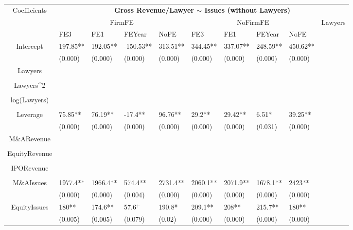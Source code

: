 \documentclass{article}
\begin{document}
\begin{table}[H]
\centering
\begin{tabular}{|clllllllll|}
\hline
\multirow{3}{*}{Coefficients} & \multicolumn{9}{c|}{\textbf{Gross Revenue/Lawyer $\sim$ Issues (without Lawyers)}} \\
\cline{2-10}
& \multicolumn{4}{c}{FirmFE} & \multicolumn{4}{c}{NoFirmFE} & \multirow{2}{*}{Lawyers} \\
\cline{2-9}
& FE3 & FE1 & FEYear & NoFE & FE3 & FE1 & FEYear & NoFE &  \\
\hline
 
Intercept & 197.85** & 192.05** & -150.53** & 313.51** & 344.45** & 337.07** & 248.59** & 450.62** & \\ 
   & (0.000) & (0.000) & (0.000) & (0.000) & (0.000) & (0.000) & (0.000) & (0.000) & \\ 
  Lawyers &  &  &  &  &  &  &  &  & \\ 
   &  &  &  &  &  &  &  &  & \\ 
  Lawyers^2 &  &  &  &  &  &  &  &  & \\ 
   &  &  &  &  &  &  &  &  & \\ 
  log(Lawyers) &  &  &  &  &  &  &  &  & \\ 
   &  &  &  &  &  &  &  &  & \\ 
  Leverage & 75.85** & 76.19** & -17.4** & 96.76** & 29.2** & 29.42** & 6.51* & 39.25** & \\ 
   & (0.000) & (0.000) & (0.000) & (0.000) & (0.000) & (0.000) & (0.031) & (0.000) & \\ 
  M\&ARevenue &  &  &  &  &  &  &  &  & \\ 
   &  &  &  &  &  &  &  &  & \\ 
  EquityRevenue &  &  &  &  &  &  &  &  & \\ 
   &  &  &  &  &  &  &  &  & \\ 
  IPORevenue &  &  &  &  &  &  &  &  & \\ 
   &  &  &  &  &  &  &  &  & \\ 
  M\&AIssues & 1977.4** & 1966.4** & 574.4** & 2731.4** & 2060.1** & 2071.9** & 1678.1** & 2423** & \\ 
   & (0.000) & (0.000) & (0.004) & (0.000) & (0.000) & (0.000) & (0.000) & (0.000) & \\ 
  EquityIssues & 180** & 174.6** & 57.6$^{+}$ & 190.8* & 209.1** & 208** & 215.7** & 180** & \\ 
   & (0.005) & (0.005) & (0.079) & (0.02) & (0.000) & (0.000) & (0.000) & (0.000) & \\ 

\end{tabular}
\end{table}
\end{document}
